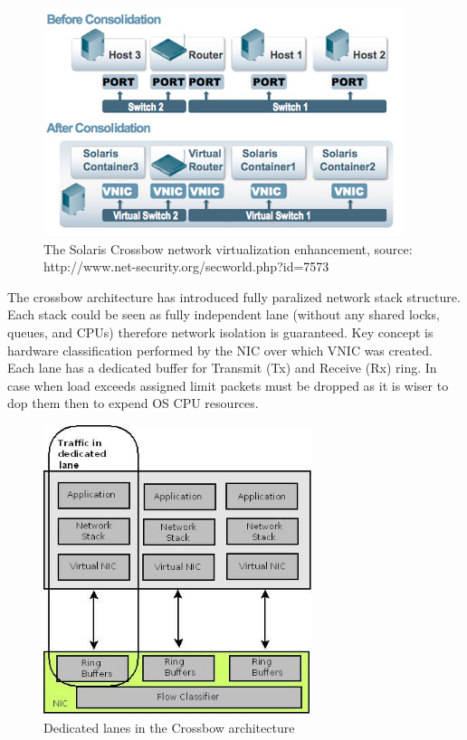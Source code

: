 \documentclass[11pt]{book}
\begin{document}
               \begin{figure}[H]
			\includegraphics[width=\textwidth]{img/crossbow.jpg}
			\caption{The Solaris Crossbow network virtualization enhancement, source: http://www.net-security.org/secworld.php?id=7573}
		\end{figure}


                The crossbow architecture has introduced fully paralized network stack structure. Each stack could be seen as fully independent lane (without
              any shared locks, queues, and CPUs) therefore network isolation is guaranteed. Key concept is
              hardware classification performed by the NIC over which VNIC was created. Each lane has a
              dedicated buffer for Transmit (Tx) and Receive (Rx) ring. In case when load exceeds assigned
              limit packets must be dropped as it is wiser to dop them then to expend OS CPU resources. 

      
                 \begin{figure}[H]
                        \begin{center}
                              \includegraphics[width=0.7\textwidth]{img/crossbow-traffic-dedicated-line.jpeg}
                              \caption{Dedicated lanes in the Crossbow architecture}
                        \end{center}
                 \end{figure}
		
\end{document}
